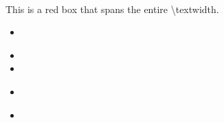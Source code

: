 \noindent
\begin{minipage}[b]{0.35\textwidth}
    \raggedright
    {\huge \textbf{\identityName}}\\
    \vspace{0.1in}
    \identityDesc
\end{minipage}%
%
\begin{minipage}[c]{0.30\textwidth}
    \centering
    \begin{tcolorbox}[width=\textwidth]
        This is a red box that spans the entire \textbackslash textwidth.
    \end{tcolorbox}
\end{minipage}%
%
\hspace{0.11\textwidth}
\begin{minipage}[c]{0.25\textwidth}
    \begin{itemize}[label={\textbullet}]
        \item[\faEnvelope] \href{mailto:\identityEmail}{\identityEmail}
        \item[\faPhone] \identityPhone
        \item[\faHome] \identityHome
        \item[\faLinkedin] \href{https://www.linkedin.com\identityLinkedIn}{\identityLinkedIn}
        \item[\faStackOverflow] \href{https://stackoverflow.com/users\identityStackOverflow}{\identityStackOverflow}
    \end{itemize}
\end{minipage}
\\ \\ 